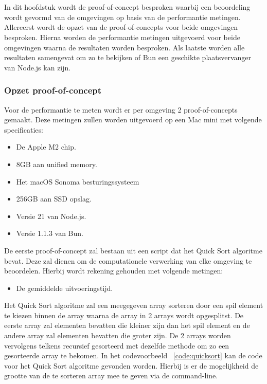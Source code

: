 
\chapter{}%
\label{ch:proof-of-concept}

In dit hoofdstuk wordt de proof-of-concept besproken 
waarbij een beoordeling wordt gevormd van de omgevingen op basis van de performantie metingen.
Allereerst wordt de opzet van de proof-of-concepts voor beide omgevingen besproken.
Hierna worden de performantie metingen uitgevoerd voor beide omgevingen waarna de resultaten worden besproken.
Als laatste worden alle resultaten samengevat om zo te bekijken of Bun een geschikte plaatsvervanger van Node.js kan zijn.

\subsection{Opzet proof-of-concept}
Voor de performantie te meten wordt er per omgeving 2 proof-of-concepts gemaakt. 
Deze metingen zullen worden uitgevoerd op een Mac mini met volgende specificaties:
\begin{itemize}
  \item De Apple M2 chip.
  \item 8GB aan unified memory.
  \item Het macOS Sonoma besturingssysteem
  \item 256GB aan SSD opslag.
  \item Versie 21 van Node.js.
  \item Versie 1.1.3 van Bun.
\end{itemize}
De eerste proof-of-concept zal bestaan uit een script dat het Quick Sort algoritme bevat. 
Deze zal dienen om de computationele verwerking van elke omgeving te beoordelen. Hierbij wordt rekening gehouden met volgende metingen:
\begin{itemize}
    \item De gemiddelde uitvoeringstijd.
\end{itemize}
Het Quick Sort algoritme zal een meegegeven array sorteren door een spil element te kiezen binnen de array
waarna de array in 2 arrays wordt opgesplitst. De eerste array zal elementen bevatten die kleiner zijn dan het spil element 
en de andere array zal elementen bevatten die groter zijn. 
De 2 arrays worden vervolgens telkens recursief gesorteerd met dezelfde methode om zo een gesorteerde array te bekomen.
In het codevoorbeeld ~\ref{code:quicksort} kan de code voor het Quick Sort algoritme gevonden worden.
Hierbij is er de mogelijkheid de grootte van de te sorteren array mee te geven via de command-line.

